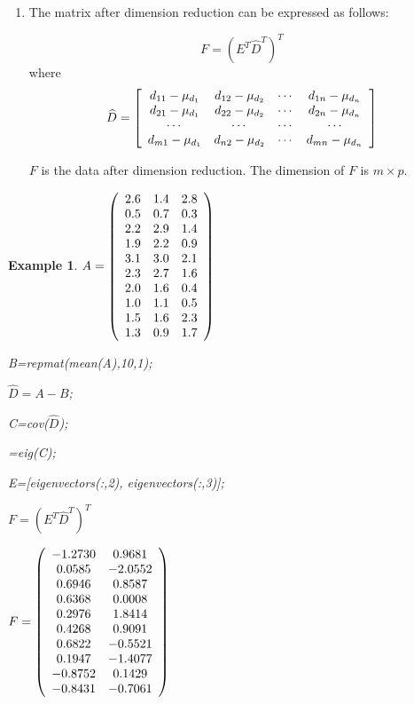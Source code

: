 \documentclass[12pt]{article}%
\newtheorem{example}[theorem]{Example}
\begin{document}
\begin{enumerate}
\item The matrix after dimension reduction can be expressed as follows:%

\[
F=(E^{T}\widehat{D}^{T})^{T}%
\]
where%
\[
\widehat{D}=\left[
\begin{array}
[c]{cccc}%
d_{11}-\mu_{d_{1}} & d_{12}-\mu_{d_{2}} & \cdots & d_{1n}-\mu_{d_{n}}\\
d_{21}-\mu_{d_{1}} & d_{22}-\mu_{d_{2}} & \cdots & d_{2n}-\mu_{d_{n}}\\
\cdots & \cdots & \cdots & \cdots\\
d_{m1}-\mu_{d_{1}} & d_{n2}-\mu_{d_{2}} & \cdots & d_{mn}-\mu_{d_{n}}%
\end{array}
\right]
\]


$F$ is the data after dimension reduction. The dimension of $F$ is $m\times
p.$
\end{enumerate}

\begin{example}
\medskip

$A=\left(
\begin{array}
[c]{ccc}%
2.6 & 1.4 & 2.8\\
0.5 & 0.7 & 0.3\\
2.2 & 2.9 & 1.4\\
1.9 & 2.2 & 0.9\\
3.1 & 3.0 & 2.1\\
2.3 & 2.7 & 1.6\\
2.0 & 1.6 & 0.4\\
1.0 & 1.1 & 0.5\\
1.5 & 1.6 & 2.3\\
1.3 & 0.9 & 1.7
\end{array}
\right)  $

\noindent B=repmat(mean(A),10,1);

\noindent$\widehat{D}=A-B$;

\noindent C=cov($\widehat{D}$);

=eig(C);

\noindent E=[eigenvectors(:,2), eigenvectors(:,3)];

\noindent$F=(E^{T} \widehat{D}^{T})^{T}$

\noindent$F=\left(
\begin{array}
[c]{cc}%
-1.2730 & 0.9681\\
0.0585 & -2.0552\\
0.6946 & 0.8587\\
0.6368 & 0.0008\\
0.2976 & 1.8414\\
0.4268 & 0.9091\\
0.6822 & -0.5521\\
0.1947 & -1.4077\\
-0.8752 & 0.1429\\
-0.8431 & -0.7061
\end{array}
\right)  $


\end{example}
\end{document}
